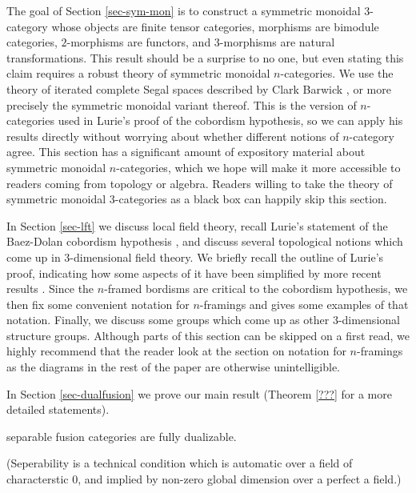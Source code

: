 \documentclass{amsart}
\begin{document}
The goal of Section \ref{sec-sym-mon} is to construct a symmetric monoidal $3$-category whose objects are finite tensor categories, morphisms are bimodule categories, $2$-morphisms are functors, and $3$-morphisms are natural transformations.  This result should be a surprise to no one, but even stating this claim requires a robust theory of symmetric monoidal $n$-categories.  We use the theory of iterated complete Segal spaces described by Clark Barwick \cite{???},  or more precisely the symmetric monoidal variant thereof.  This is the version of $n$-categories used in Lurie's proof of the cobordism hypothesis, so we can apply his results directly without worrying about whether different notions of $n$-category agree.  This section has a significant amount of expository material about symmetric monoidal $n$-categories, which we hope will make it more accessible to readers coming from topology or algebra.  Readers willing to take the theory of symmetric monoidal $3$-categories as a black box can happily skip this section.

In Section \ref{sec-lft} we discuss local field theory, recall Lurie's statement of the Baez-Dolan cobordism hypothesis \cite[Theorem 2.4.18]{0905.0465}, and discuss several topological notions which come up in $3$-dimensional field theory.  We briefly recall the outline of Lurie's proof, indicating how some aspects of it have been simplified by more recent results \cite{???}.  Since the $n$-framed bordisms are critical to the cobordism hypothesis, we then fix some convenient notation for $n$-framings and gives some examples of that notation.  Finally, we discuss some groups which come up as other $3$-dimensional structure groups.  Although parts of this section can be skipped on a first read, we highly recommend that the reader look at the section on notation for $n$-framings as the diagrams in the rest of the paper are otherwise unintelligible.  

In Section \ref{sec-dualfusion} we prove our main result (Theorem \ref{???} for a more detailed statements).

\begin{theorem}
separable fusion categories are fully dualizable.
\end{theorem}

(Seperability is a technical condition which is automatic over a field of characterstic $0$, and implied by non-zero global dimension over a perfect a field.)
\end{document}
